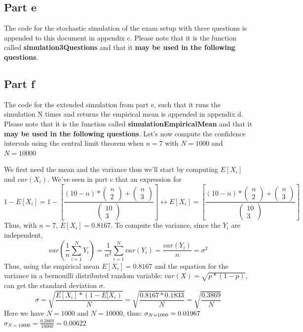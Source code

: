 \documentclass[14.5pt]{article}
\begin{document}
\subsection*{Part e}
The code for the stochastic simulation of the exam setup with three questions is
appended to this document in appendix c.
Please note that it is the function called \textbf{simulation3Questions} and that it
\textbf{may be used in the following questions}.


\subsection*{Part f}
The code for the extended simulation from part e, such that it runs the simulation
N times and returns the empirical mean is appended in appendix d.
Please note that it is the function called \textbf{simulationEmpiricalMean} and that it
\textbf{may be used in the following questions}.
Let's now compute the confidence intervals using the central limit theorem when
$ n = 7 $ with $ N = 1000 $ and $ N = 10000 $

We first need the mean and the variance thus we'll start by computing
$E[X_{i}]$ and $var(X_{i})$. We've seen in part c that an expression for
\begin{equation*}
    1 - E[X_{i}] = 1 - [ \frac{(10 - n) * \begin{pmatrix} n \\ 2 \end{pmatrix} + \begin{pmatrix} n \\ 3 \end{pmatrix}}{\begin{pmatrix} 10 \\ 3 \end{pmatrix}}]
    \leftrightarrow
    E[X_{i}] = [ \frac{(10 - n) * \begin{pmatrix} n \\ 2 \end{pmatrix} + \begin{pmatrix} n \\ 3 \end{pmatrix}}{\begin{pmatrix} 10 \\ 3 \end{pmatrix}}]
\end{equation*}
Thus, with $ n = 7$, $ E[X_{i}] = 0.8167 $.
To compute the variance, since the $ Y_{i} $ are independent,
\begin{equation}
    var(\frac{1}{n} \sum_{i=1}^N Y_{i}) = \frac{1}{n^2} \sum_{i=1}^N var(Y_{i}) = \frac{var(Y_{i})}{n} = \sigma^2
\end{equation}
Thus, using the empirical mean $ E[X_{i}] = 0.8167 $ and the equation for the variance in a bernouilli distributed
random variable: $ var(X) = \sqrt{p * (1 - p)} $, can get the standard deviation $\sigma$.
\begin{equation}
    \sigma = \sqrt{\frac{E[X_{i}] * (1 - E[X_{i})}{N}} = \sqrt{\frac{0.8167 * 0.1833‬}{N}} = \sqrt{\frac{0.3869}{N}}
\end{equation}
Here we have $N = 1000$ and $N = 10000$, thus:
$\sigma_{N=1000} = 0.01967 \\$
$\sigma_{N=10000} = \frac{0.3869}{10000} = 0.00622$
\end{document}
